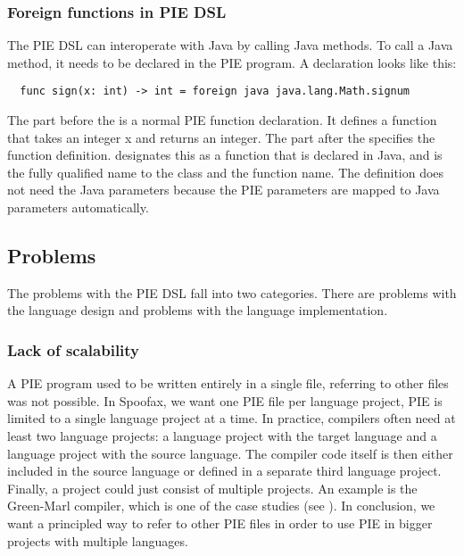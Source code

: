 \subsubsection{Foreign functions in \ac{PIE} \ac{DSL}}
\label{subsubsec:problem_analysis__background__foreign_functions}

The \ac{PIE} \ac{DSL} can interoperate with Java by calling Java methods.
To call a Java method, it needs to be declared in the \ac{PIE} program.
A declaration looks like this:
\begin{lstlisting}
  func sign(x: int) -> int = foreign java java.lang.Math.signum
\end{lstlisting}
The part before the \inlinecode{=} is a normal \ac{PIE} function declaration.
It defines a function  that takes an integer x and returns an integer.
The part after the \inlinecode{=} specifies the function definition.
 designates this as a function that is declared in Java, and  is the fully qualified name to the class and the function name.
The definition does not need the Java parameters because the \ac{PIE} parameters are mapped to Java parameters automatically.

\subsection{Problems}
\label{subsec:problem_analysis__problems}

The problems with the \ac{PIE} \ac{DSL} fall into two categories.
There are problems with the language design and problems with the language implementation.

\subsubsection{Lack of scalability}
\label{subsubsec:problem_analysis__problems__scalability}

A \ac{PIE} program used to be written entirely in a single file, referring to other files was not possible.
In Spoofax, we want one \ac{PIE} file per language project, \ac{PIE} is limited to a single language project at a time.
In practice, compilers often need at least two language projects: a language project with the target language and a language project with the source language.
The compiler code itself is then either included in the source language or defined in a separate third language project.
Finally, a project could just consist of multiple projects.
An example is the Green-Marl compiler, which is one of the case studies (see ).
In conclusion, we want a principled way to refer to other \ac{PIE} files in order to use \ac{PIE} in bigger projects with multiple languages.

